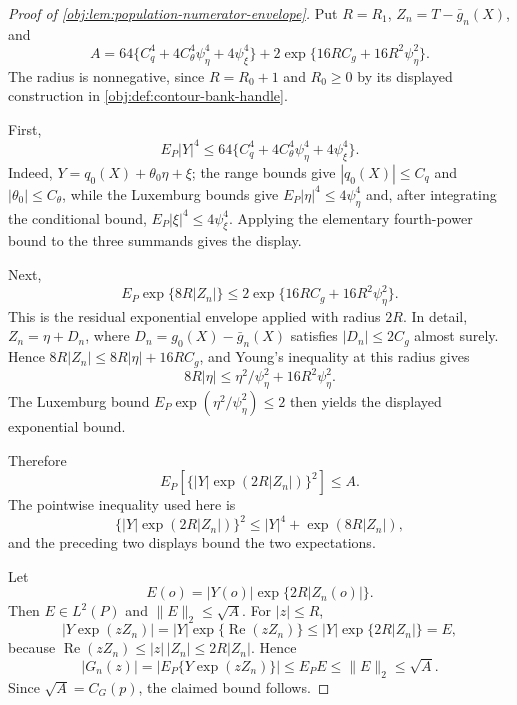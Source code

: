 \documentclass[11pt]{article}
\begin{document}
\begin{proof}[Proof of \cref{obj:lem:population-numerator-envelope}]
Put \(R=R_1\), \(Z_n=T-\bar g_n(X)\), and
\[
A=
64\{C_q^4+4C_\theta^4\psi_\eta^4+4\psi_\xi^4\}
+2\exp\{16RC_g+16R^2\psi_\eta^2\}.
\]
The radius is nonnegative, since \(R=R_0+1\) and \(R_0\ge0\) by its displayed construction in \cref{obj:def:contour-bank-handle}. %

First,
\[
E_P|Y|^4
\le
64\{C_q^4+4C_\theta^4\psi_\eta^4+4\psi_\xi^4\}.
\]
Indeed, \(Y=q_0(X)+\theta_0\eta+\xi\); the range bounds give
\(|q_0(X)|\le C_q\) and \(|\theta_0|\le C_\theta\), while the Luxemburg bounds give
\(E_P|\eta|^4\le4\psi_\eta^4\) and, after integrating the conditional bound,
\(E_P|\xi|^4\le4\psi_\xi^4\). Applying the elementary fourth-power bound to the
three summands gives the display. %

Next,
\[
E_P\exp\{8R|Z_n|\}
\le
2\exp\{16RC_g+16R^2\psi_\eta^2\}.
\]
This is the residual exponential envelope applied with radius \(2R\). In detail,
\(Z_n=\eta+D_n\), where \(D_n=g_0(X)-\bar g_n(X)\) satisfies
\(|D_n|\le2C_g\) almost surely. Hence
\(8R|Z_n|\le 8R|\eta|+16RC_g\), and Young's inequality at this radius gives
\[
8R|\eta|\le \eta^2/\psi_\eta^2+16R^2\psi_\eta^2.
\]
The Luxemburg bound \(E_P\exp(\eta^2/\psi_\eta^2)\le2\) then yields the displayed
exponential bound. %

Therefore
\[
E_P\left[\{|Y|\exp(2R|Z_n|)\}^2\right]
\le
A.
\]
The pointwise inequality used here is
\[
\{|Y|\exp(2R|Z_n|)\}^2
\le
|Y|^4+\exp(8R|Z_n|),
\]
and the preceding two displays bound the two expectations. %

Let
\[
E(o)=|Y(o)|\exp\{2R|Z_n(o)|\}.
\]
Then \(E\in L^2(P)\) and \(\|E\|_2\le\sqrt A\). For \(|z|\le R\),
\[
\left|Y\exp(zZ_n)\right|
=
|Y|\exp\{\operatorname{Re}(zZ_n)\}
\le
|Y|\exp\{2R|Z_n|\}
=E,
\]
because \(\operatorname{Re}(zZ_n)\le |z|\,|Z_n|\le2R|Z_n|\). Hence
\[
|G_n(z)|
=
\left|E_P\{Y\exp(zZ_n)\}\right|
\le
E_P E
\le
\|E\|_2
\le
\sqrt A.
\]
Since \(\sqrt A=C_G(p)\), the claimed bound follows. %
\end{proof}
\end{document}
